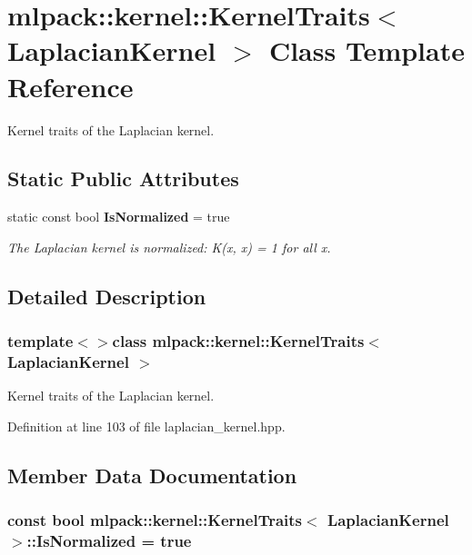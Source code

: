 \section{mlpack\-:\-:kernel\-:\-:Kernel\-Traits$<$ Laplacian\-Kernel $>$ Class Template Reference}
\label{classmlpack_1_1kernel_1_1KernelTraits_3_01LaplacianKernel_01_4}


Kernel traits of the Laplacian kernel.  


\subsection*{Static Public Attributes}
\begin{DoxyCompactItemize}
\item 
static const bool {\bf Is\-Normalized} = true
\begin{DoxyCompactList}\small\item\em The Laplacian kernel is normalized\-: K(x, x) = 1 for all x. \end{DoxyCompactList}\end{DoxyCompactItemize}


\subsection{Detailed Description}
\subsubsection*{template$<$$>$class mlpack\-::kernel\-::\-Kernel\-Traits$<$ Laplacian\-Kernel $>$}

Kernel traits of the Laplacian kernel. 

Definition at line 103 of file laplacian\-\_\-kernel.\-hpp.



\subsection{Member Data Documentation}
\subsubsection[{Is\-Normalized}]{\setlength{\rightskip}{0pt plus 5cm}const bool {\bf mlpack\-::kernel\-::\-Kernel\-Traits}$<$ {\bf Laplacian\-Kernel} $>$\-::Is\-Normalized = true\hspace{0.3cm}{\ttfamily [static]}}\label{classmlpack_1_1kernel_1_1KernelTraits_3_01LaplacianKernel_01_4_a3057882456025fdf59e196dc1eeeff93}


